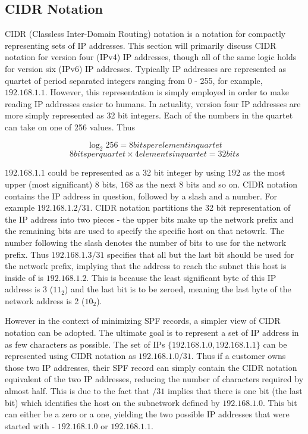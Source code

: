 \subsection{CIDR Notation} \label{sec:CIDR}
CIDR (Classless Inter-Domain Routing) notation is a notation for compactly representing sets of IP addresses. This section will primarily discuss CIDR notation for version four (IPv4) IP addresses, though all of the same logic holds for version six (IPv6) IP addresses. Typically IP addresses are represented as quartet of period separated integers ranging from 0 - 255, for example, $192.168.1.1$. However, this representation is simply employed in order to make reading IP addresses easier to humans. In actuality, version four IP addresses are more simply represented as 32 bit integers. Each of the numbers in the quartet can take on one of 256 values. Thus

$$\log_2 256 = 8 bits per element in quartet$$
$$8 bits per quartet \times 4 elements in quartet = 32 bits$$

$192.168.1.1$ could be represented as a 32 bit integer by using $192$ as the most upper (most significant) 8 bits, $168$ as the next 8 bits and so on. CIDR notation contains the IP address in question, followed by a slash and a number. For example $192.168.1.2/31$. CIDR notation partitions the 32 bit representation of the IP address into two pieces - the upper bits make up the network prefix and the remaining bits are used to specify the specific host on that netowrk. The number following the slash denotes the number of bits to use for the network prefix. Thus $192.168.1.3/31$ specifies that all but the last bit should be used for the network prefix, implying that the address to reach the subnet this host is inside of is $192.168.1.2$. This is because the least significant byte of this IP address is 3 ($11_2$) and the last bit is to be zeroed, meaning the last byte of the network address is 2 ($10_2$). 

However in the context of minimizing SPF records, a simpler view of CIDR notation can be adopted. The ultimate goal is to represent a set of IP address in as few characters as possible. The set of IPs $\{192.168.1.0, 192.168.1.1\}$ can be represented using CIDR notation as $192.168.1.0/31$. Thus if a customer owns those two IP addresses, their SPF record can simply contain the CIDR notation equivalent of the two IP addresses, reducing the number of characters required by almost half. This is due to the fact that $/31$ implies that there is one bit (the last bit) which identifies the host on the subnetwork defined by $192.168.1.0$. This bit can either be a zero or a one, yielding the two possible IP addresses that were started with - $192.168.1.0$ or $192.168.1.1$.



